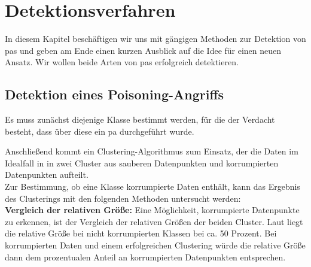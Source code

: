 \documentclass[twoside, 12pt,a4paper]{book}
\numberwithin{equation}{section}
\begin{document}
	
	\section{Detektionsverfahren}
	In diesem Kapitel beschäftigen wir uns mit gängigen Methoden zur Detektion von \acp{pa} und geben am Ende einen kurzen Ausblick auf die Idee für einen neuen Ansatz. Wir wollen beide Arten von \acp{pa} erfolgreich detektieren. 
	
	\subsection{Detektion eines Poisoning-Angriffs}
	
	Es muss zunächst diejenige Klasse bestimmt werden, für die der Verdacht besteht, dass über diese ein \ac{pa} durchgeführt wurde.
	
	\noindent Anschließend kommt ein Clustering-Algorithmus zum Einsatz, der die Daten im Idealfall in in zwei Cluster aus sauberen Datenpunkten und korrumpierten Datenpunkten aufteilt.\\
	
	\noindent Zur Bestimmung, ob eine Klasse korrumpierte Daten enthält, kann das Ergebnis
	des Clusterings mit den folgenden Methoden untersucht werden:\\
	
	\noindent \textbf{Vergleich der relativen Größe:} Eine Möglichkeit, korrumpierte Datenpunkte
	zu erkennen, ist der Vergleich der relativen Größen der beiden Cluster. Laut \cite{AC}
	liegt die relative Größe bei nicht korrumpierten Klassen bei ca. 50 Prozent. Bei korrumpierten Daten und einem erfolgreichen Clustering würde die relative Größe dann dem prozentualen Anteil an korrumpierten Datenpunkten entsprechen.\\
	
\end{document}
